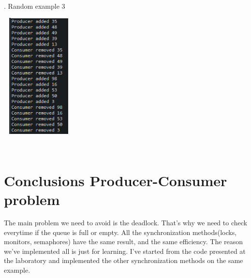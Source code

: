 \documentclass[14pt]{article}
\begin{document}
\begin{center}
. Random example 3\\
\vspace{10mm}

\includegraphics[height=2.5in, width = 1.5in]{pclock3.png}\\
\end{center}\\


\section*{Conclusions Producer-Consumer problem}
\vspace{10 mm}
The main problem we need to avoid is the deadlock. That's why we need to check everytime if the queue is full or empty. All the synchronization methods(locks, monitors, semaphores) have the same result, and the same efficiency. The reason we've implemented all is just for learning. I've started from the code presented at the laboratory and implemented the other synchronization methods on the same example.

\newpage
\end{document}
